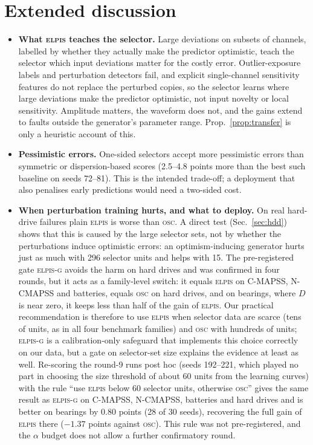 \documentclass{esannV2}
\newcommand{\OSC}{\textsc{osc}}
\newcommand{\RPT}{\textsc{elpis}}
\newcommand{\AUTOD}{\textsc{elpis-g}}
\begin{document}
\FloatBarrier
\section{Extended discussion}\label{app:discussion}
\begin{itemize}
\item \textbf{What \RPT{} teaches the selector.} Large deviations on subsets of channels, labelled by whether they actually make the predictor optimistic, teach the selector which input deviations matter for the costly error. Outlier-exposure labels and perturbation detectors fail, and explicit single-channel sensitivity features do not replace the perturbed copies, so the selector learns where large deviations make the predictor optimistic, not input novelty or local sensitivity. Amplitude matters, the waveform does not, and the gains extend to faults outside the generator's parameter range. Prop.~\ref{prop:transfer} is only a heuristic account of this.
\item \textbf{Pessimistic errors.} One-sided selectors accept more pessimistic errors than symmetric or dispersion-based scores (2.5--4.8 points more than the best such baseline on seeds 72--81). This is the intended trade-off; a deployment that also penalises early predictions would need a two-sided cost.
\item \textbf{When perturbation training hurts, and what to deploy.} On real hard-drive failures plain \RPT{} is worse than \OSC. A direct test (Sec.~\ref{sec:hdd}) shows that this is caused by the large selector sets, not by whether the perturbations induce optimistic errors: an optimism-inducing generator hurts just as much with 296 selector units and helps with 15. The pre-registered gate \AUTOD{} avoids the harm on hard drives and was confirmed in four rounds, but it acts as a family-level switch: it equals \RPT{} on C-MAPSS, N-CMAPSS and batteries, equals \OSC{} on hard drives, and on bearings, where $D$ is near zero, it keeps less than half of the gain of \RPT. Our practical recommendation is therefore to use \RPT{} when selector data are scarce (tens of units, as in all four benchmark families) and \OSC{} with hundreds of units; \AUTOD{} is a calibration-only safeguard that implements this choice correctly on our data, but a gate on selector-set size explains the evidence at least as well. Re-scoring the round-9 runs post hoc (seeds 192--221, which played no part in choosing the size threshold of about 60 units from the learning curves) with the rule ``use \RPT{} below 60 selector units, otherwise \OSC'' gives the same result as \AUTOD{} on C-MAPSS, N-CMAPSS, batteries and hard drives and is better on bearings by 0.80 points (28 of 30 seeds), recovering the full gain of \RPT{} there ($-1.37$ points against \OSC). This rule was not pre-registered, and the $\alpha$ budget does not allow a further confirmatory round.

\end{itemize}
\end{document}
